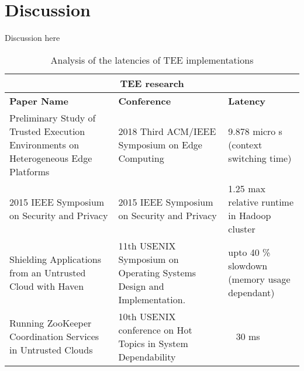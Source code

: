 \documentclass[conference]{IEEEtran}
\begin{document}
\section{Discussion}
Discussion here
\begin{table*}[t]
    \centering
    \caption{Analysis of the latencies of TEE implementations}

    \begin{center}
        \begin{tabular}{ |p{}||p{}|p{}|  }
            \hline
            \multicolumn{3}{|c|}{TEE research}                                                                                                                                                                                                                                                                \\
            \hline
            \textbf{Paper Name }                                                                       & \textbf{Conference}                                                                                                                   & \textbf{Latency}                                             \\
            \hline
            Preliminary Study of Trusted Execution Environments on Heterogeneous Edge Platforms        & 2018 Third ACM/IEEE Symposium on Edge Computing                                                                                       & 9.878 micro s (context switching time)                       \\ \hline
            2015 IEEE Symposium on Security and Privacy                                                & 2015 IEEE Symposium on Security and Privacy                                                                                           & 1.25 max relative runtime in Hadoop cluster                  \\ \hline
            Shielding Applications from an Untrusted Cloud with Haven                                  & 11th USENIX Symposium on Operating Systems Design and Implementation.                                                                 & upto 40 \% slowdown (memory usage dependant)                 \\ \hline
            Running ZooKeeper Coordination Services in Untrusted Clouds                                & 10th USENIX conference on Hot Topics in System Dependability                                                                          & ~ 30 ms                                                      \\ \hline

\end{tabular}
\end{center}
\end{table*}
\end{document}

